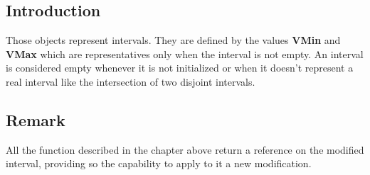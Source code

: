 \hypertarget{classHurricane_1_1Interval_secIntervalIntro}{}\subsection{Introduction}\label{classHurricane_1_1Interval_secIntervalIntro}
Those objects represent intervals. They are defined by the values {\bfseries V\-Min} and {\bfseries V\-Max} which are representatives only when the interval is not empty. An interval is considered empty whenever it is not initialized or when it doesn't represent a real interval like the intersection of two disjoint intervals.\hypertarget{classHurricane_1_1Interval_secIntervalRemark}{}\subsection{Remark}\label{classHurricane_1_1Interval_secIntervalRemark}
All the function described in the chapter above return a reference on the modified interval, providing so the capability to apply to it a new modification. 

